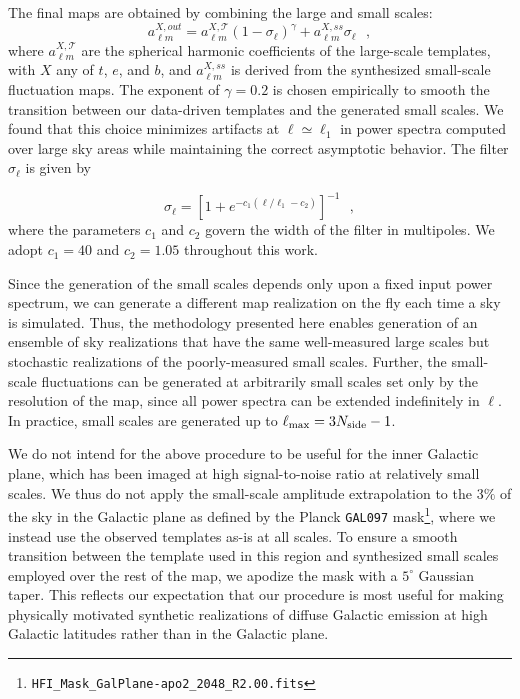 \documentclass[twocolumn]{aastex631}
\begin{document}
The final maps are obtained by combining the large and small scales: 
\begin{equation} \label{eq:filter}
    a_{\ell m }^{X, out}=  a_{\ell m }^{X, \mathcal{T}} \left(1-\sigma_\ell\right)^{\gamma} + a_{\ell m }^{X, ss} \sigma_\ell
    ~~~, 
\end{equation}
where $a_{\ell m }^{X, \mathcal{T}}$ are the spherical harmonic coefficients of the large-scale templates, with $X$ any of $t$, $e$, and $b$, and $a_{\ell m }^{X, ss}$ is derived from the synthesized small-scale fluctuation maps. The exponent of $\gamma = 0.2$ is chosen empirically to smooth the transition between our data-driven templates and the generated small scales. We found that this choice minimizes artifacts at $\ell \simeq \ell_1$ in power spectra computed over large sky areas while maintaining the correct asymptotic behavior. The filter $\sigma_\ell$ is given by

\begin{equation} \label{eq:filter2}
\sigma_\ell  = \left[1+  e^{ -c_1 (\ell/ \ell_1  -c_2 )}\right]^{-1}  
~~~,
\end{equation}
where the parameters $c_1$ and $c_2$ govern the width of the filter in multipoles. We adopt $c_1=40$ and $c_2=1.05$ throughout this work.

Since the generation of the small scales depends only upon a fixed input power spectrum, we can generate a different map realization on the fly each time a sky is simulated. Thus, the methodology presented here enables generation of an ensemble of sky realizations that have the same well-measured large scales but stochastic realizations of the poorly-measured small scales. Further, the small-scale fluctuations can be generated at arbitrarily small scales set only by the resolution of the map, since all power spectra can be extended indefinitely in $\ell$. In practice, small scales are generated up to $\ell_{\rm max} = 3N_{\rm side}-1$.

We do not intend for the above procedure to be useful for the inner Galactic plane, which has been imaged at high signal-to-noise ratio at relatively small scales. We thus do not apply the small-scale amplitude extrapolation to the $3\%$ of the sky in the Galactic plane as defined by the Planck \texttt{GAL097} mask\footnote{\texttt{HFI\_Mask\_GalPlane-apo2\_2048\_R2.00.fits}}, where we instead use the observed templates as-is at all scales. To ensure a smooth transition between the template used in this region and synthesized small scales employed over the rest of the map, we apodize the mask with a $5^\circ$ Gaussian taper. This reflects our expectation that our procedure is most useful for making physically motivated synthetic realizations of diffuse Galactic emission at high Galactic latitudes rather than in the Galactic plane.
\end{document}
